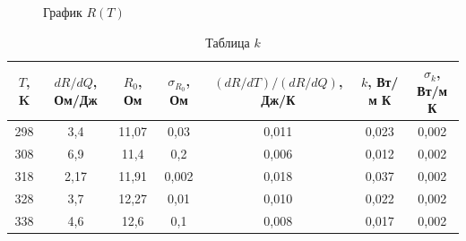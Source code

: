\documentclass[a4paper, 12pt]{article}%
\begin{document}
\begin{enumerate}
\begin{figure}[h]
\caption{График $R(T)$}
\end{figure}
\FloatBarrier
\begin{table}[h]
\begin{tabular}{|c|c|c|c|c|c|c|}
\hline
$T$, K & $dR/dQ$, Ом/Дж & $R_0$, Ом & $\sigma_{R_0}$, Ом & $(dR/dT)/(dR/dQ)$, Дж/К & $k$, Вт/м К & $\sigma_k$, Вт/м К \\ \hline
298 & 3,4 & 11,07 & 0,03 & 0,011 & 0,023 & 0,002 \\ \hline
308 & 6,9 & 11,4 & 0,2 & 0,006 & 0,012 & 0,002 \\ \hline
318 & 2,17 & 11,91 & 0,002 & 0,018 & 0,037 & 0,002 \\ \hline
328 & 3,7 & 12,27 & 0,01 & 0,010 & 0,022 & 0,002 \\ \hline
338 & 4,6 & 12,6 & 0,1 & 0,008 & 0,017 & 0,002 \\ \hline
\end{tabular}
\caption{Таблица $k$}
\end{table}
\end{enumerate}
\end{document}
